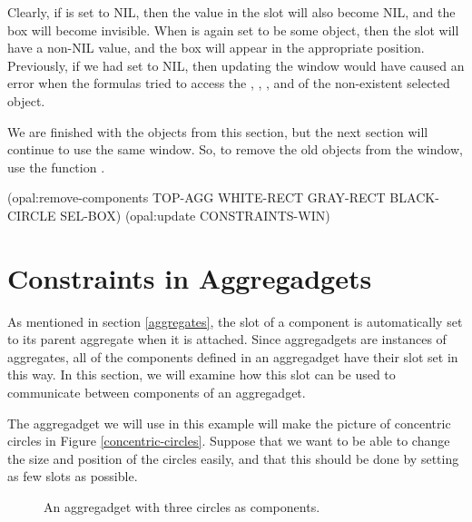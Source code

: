 Clearly, if  is set to NIL, then the value in the
 slot will also become NIL, and the box will become
invisible.  When  is again set to be some object, then
the  slot will have a non-NIL value, and the box will
appear in the appropriate position.  Previously, if we had set
 to NIL, then updating the window would have caused an
error when the formulas tried to access the , ,
, and  of the non-existent selected object.

We are finished with the objects from this section, but the next
section will continue to use the same window.  So, to remove the old
objects from the window, use the function .

\begin{programexample}
(opal:remove-components TOP-AGG WHITE-RECT GRAY-RECT BLACK-CIRCLE SEL-BOX)
(opal:update CONSTRAINTS-WIN)
\end{programexample}


\section{Constraints in Aggregadgets}
\label{aggregadget-ex}

As mentioned in section \ref{aggregates}, the  slot of a
component is automatically set to its parent aggregate when it is
attached.  Since aggregadgets are instances of aggregates, all of the
components defined in an aggregadget have their  slot set
in this way.  In this section, we will examine how this slot can be
used to communicate between components of an aggregadget.

The aggregadget we will use in this example will make the picture of
concentric circles in Figure \ref{concentric-circles}.  Suppose that
we want to be able to change the size and position of the circles
easily, and that this should be done by setting as few slots as
possible.

\begin{figure}
\begin{center}
\end{center}
\caption{An aggregadget with three circles as components.}
\end{figure}

